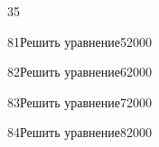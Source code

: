 \begin{TrigSourcePage}{35}
\begin{TrigExercise}{81}{Решить уравнение}{5}{2000}
\end{TrigExercise}
\begin{TrigExercise}{82}{Решить уравнение}{6}{2000}
\end{TrigExercise}
\begin{TrigExercise}{83}{Решить уравнение}{7}{2000}
\end{TrigExercise}
\begin{TrigExercise}{84}{Решить уравнение}{8}{2000}
\end{TrigExercise}
\end{TrigSourcePage}

